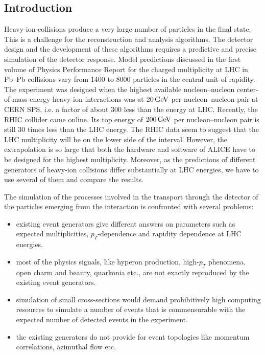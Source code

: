 \documentclass[12pt,a4paper,twoside]{article}
\begin{document}
\subsection{Introduction}
Heavy-ion collisions produce a very large number of particles in the
final state. This is a challenge for the reconstruction and analysis
algorithms. The detector design and the development of these algorithms requires a predictive
and precise simulation of the detector response.  Model predictions
discussed in the first volume of Physics Performance Report for the
charged multiplicity at LHC in \mbox{Pb--Pb} collisions vary from 1400
to 8000 particles in the central unit of rapidity.  The experiment was
designed when the highest available nucleon--nucleon center-of-mass energy
heavy-ion interactions was at $20 \, {\rm GeV}$ per nucleon--nucleon
pair at CERN SPS, i.e. a factor of about 300 less than the energy at
LHC.  Recently, the RHIC collider came online.  Its top energy of
$200\, {\rm GeV}$ per nucleon--nucleon pair is still 30 times less
than the LHC energy.  The RHIC data seem to suggest that the LHC
multiplicity will be on the lower side of the interval. However, the
extrapolation is so large that both the hardware and software of ALICE
have to be designed for the highest multiplicity.  Moreover, as the
predictions of different generators of heavy-ion collisions differ
substantially at LHC energies, we have to use several of them and
compare the results.

The simulation of the processes involved in the transport through the
detector of the particles emerging from the interaction is confronted
with several problems:

\begin {itemize}
\item existing event generators give different answers on parameters
  such as expected multiplicities, $p_T$-dependence and rapidity
  dependence at LHC energies.

\item most of the physics signals, like hyperon production, high-$p_T$
  phenomena, open charm and beauty, quarkonia etc., are not exactly
  reproduced by the existing event generators.

\item simulation of small cross-sections would demand prohibitively
  high computing resources to simulate a number of events that is commensurable with
  the expected number of detected events in the experiment.

\item the existing generators do not provide for event topologies like
  momentum correlations, azimuthal flow etc.
\end {itemize}
\end{document}
